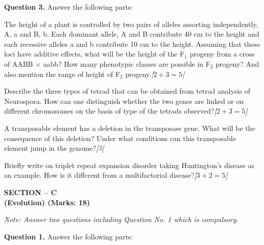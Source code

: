 \documentclass[11pt,a4paper]{article}
\newcommand{\pts}[1]{\hfill   \textit{[#1]}}
\begin{document}
\medskip


\noindent   \textbf{Question 3.} Answer the following parts:

\begin{parts}
  \item The height of a plant is controlled by two pairs of alleles assorting independently, A, a and B, b. Each dominant allele, A and B contribute 40 cm to the height and each recessive alleles a and b contribute 10 cm to the height. Assuming that these loci have additive effects, what will be the height of the F$_1$ progeny from a cross of AABB $ \times$ aabb? How many phenotypic classes are possible in F$_2$ progeny? And also mention the range of height of F$_2$ progeny.\pts{$2 + 3 = 5$}
  \item Describe the three types of tetrad that can be obtained from tetrad analysis of Neurospora. How can one distinguish whether the two genes are linked or on different chromosomes on the basis of type of the tetrads observed?\pts{$2 + 3 = 5$}
  \item A transposable element has a deletion in the transposase gene. What will be the consequence of this deletion? Under what conditions can this transposable element jump in the genome?\pts{3}
  \item Briefly write on triplet repeat expansion disorder taking Huntington's disease as an example. How is it different from a multifactorial disease?\pts{$3 + 2 = 5$}
\end{parts}

\pagebreak

\begin{center}
   \textbf{SECTION -- C} \\
   \textbf{(Evolution) (Marks: 18)}
\end{center}

\smallskip



\noindent   \textit{Note: Answer two questions including Question No. 1 which is compulsory.}

\medskip


\noindent   \textbf{Question 1.} Answer the following parts:
\end{document}
